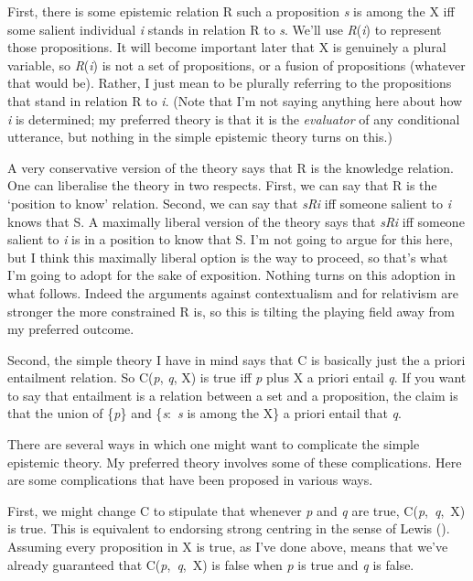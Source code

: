 \documentclass[
  10pt,
  letterpaper,
  DIV=11,
  numbers=noendperiod,
  twoside]{scrartcl}
\begin{document}
First, there is some epistemic relation R such a proposition \emph{s} is
among the X iff some salient individual \emph{i} stands in relation R to
\emph{s}. We'll use \emph{R}(\emph{i}) to represent those propositions.
It will become important later that X is genuinely a plural variable, so
\emph{R}(\emph{i}) is not a set of propositions, or a fusion of
propositions (whatever that would be). Rather, I just mean to be
plurally referring to the propositions that stand in relation R to
\emph{i}. (Note that I'm not saying anything here about how \emph{i} is
determined; my preferred theory is that it is the \emph{evaluator} of
any conditional utterance, but nothing in the simple epistemic theory
turns on this.)

A very conservative version of the theory says that R is the knowledge
relation. One can liberalise the theory in two respects. First, we can
say that R is the `position to know' relation. Second, we can say that
\emph{sRi} iff someone salient to \emph{i} knows that S. A maximally
liberal version of the theory says that \emph{sRi} iff someone salient
to \emph{i} is in a position to know that S. I'm not going to argue for
this here, but I think this maximally liberal option is the way to
proceed, so that's what I'm going to adopt for the sake of exposition.
Nothing turns on this adoption in what follows. Indeed the arguments
against contextualism and for relativism are stronger the more
constrained R is, so this is tilting the playing field away from my
preferred outcome.

Second, the simple theory I have in mind says that C is basically just
the a priori entailment relation. So C(\emph{p}, \emph{q}, X) is true
iff \emph{p} plus X a priori entail \emph{q}. If you want to say that
entailment is a relation between a set and a proposition, the claim is
that the union of \{\emph{p}\} and \{\emph{s}:~\emph{s} is among the X\}
a priori entail that \emph{q}.

There are several ways in which one might want to complicate the simple
epistemic theory. My preferred theory involves some of these
complications. Here are some complications that have been proposed in
various ways.

First, we might change C to stipulate that whenever \emph{p} and
\emph{q} are true, C(\emph{p},~\emph{q},~X) is true. This is equivalent
to endorsing strong centring in the sense of Lewis
(). Assuming every proposition in X is
true, as I've done above, means that we've already guaranteed that
C(\emph{p},~\emph{q},~X) is false when \emph{p} is true and \emph{q} is
false.
\end{document}
